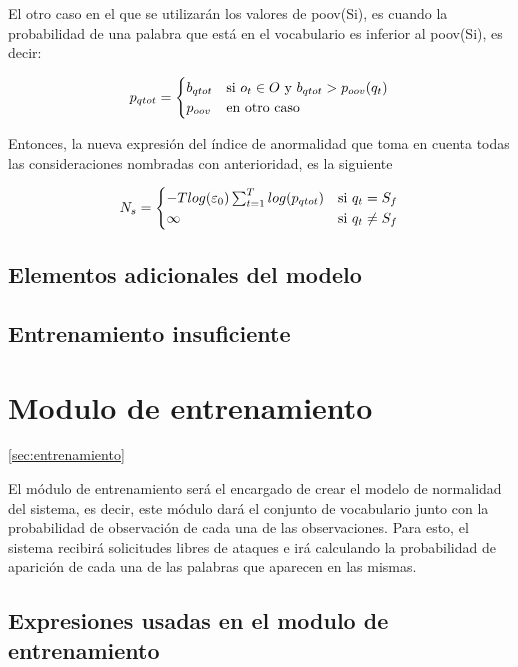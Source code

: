 El otro caso en el que se utilizarán los valores de poov(Si), es cuando la probabilidad de una palabra que está en el vocabulario es inferior al poov(Si), es decir:


\begin{equation}\label{eq:Pqtot}
p_{qtot} = 
	\begin{cases} 
      b_{qtot} & $si $  o_{t} \in O $ y $ b_{qtot} > p_{oov}(q_{t})\\
      p_{oov} & $en otro caso$ \\ 
   \end{cases}
\end{equation}


Entonces, la nueva expresión del índice de anormalidad que toma en cuenta todas las consideraciones nombradas con anterioridad, es la siguiente

\begin{equation}\label{eq:Ns}
N_{s} = 
	\begin{cases} 
      -Tlog(\varepsilon_{0})\sum_{t=1}^{T}log(p_{qtot}) & $si $  q_{t} = S_{f} \\
      \infty & $si $  q_{t} \neq S_{f} \\ 
   \end{cases}
\end{equation}

\subsection{Elementos adicionales del modelo}
\subsection*{Entrenamiento insuficiente}
\section{Modulo de entrenamiento}\ref{sec:entrenamiento}

El módulo de entrenamiento será el encargado de crear el modelo de normalidad del sistema, es decir, este módulo dará el conjunto de vocabulario junto con la probabilidad de observación de cada una de las observaciones. Para esto, el sistema recibirá solicitudes libres de ataques e irá calculando la probabilidad de aparición de cada una de las palabras que aparecen en las mismas.

\subsection{Expresiones usadas en el modulo de entrenamiento}

